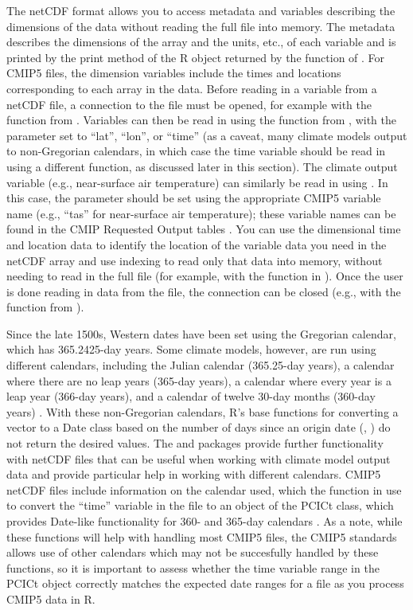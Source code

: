 The netCDF format allows you to access metadata and variables describing
the dimensions of the data without reading the full file into memory.
The metadata describes the dimensions of the array and the units, etc.,
of each variable and is printed by the print method of the R object
returned by the  function of . For CMIP5
files, the dimension variables include the times and locations
corresponding to each array in the data. Before reading in a variable
from a netCDF file, a connection to the file must be opened, for example
with the  function from . Variables can then
be read in using the  function from , with
the  parameter set to ``lat'', ``lon'', or ``time'' (as a
caveat, many climate models output to non-Gregorian calendars, in which
case the time variable should be read in using a different function, as
discussed later in this section). The climate output variable (e.g.,
near-surface air temperature) can similarly be read in using
. In this case, the  parameter should be
set using the appropriate CMIP5 variable name (e.g., ``tas'' for
near-surface air temperature); these variable names can be found in the
CMIP Requested Output tables \citep{taylor2010cmip5}. You can use the
dimensional time and location data to identify the location of the
variable data you need in the netCDF array and use indexing to read only
that data into memory, without needing to read in the full file (for
example, with the  function in
). Once the user is done reading in data from the
file, the connection can be closed (e.g., with the 
function from ).

Since the late 1500s, Western dates have been set using the Gregorian
calendar, which has 365.2425-day years. Some climate models, however,
are run using different calendars, including the Julian calendar
(365.25-day years), a calendar where there are no leap years (365-day
years), a calendar where every year is a leap year (366-day years), and
a calendar of twelve 30-day months (360-day years)
\citep{cfconventions}. With these non-Gregorian calendars, R's base
functions for converting a vector to a Date class based on the number of
days since an origin date (, ) do not
return the desired values. The  \citep{PCICt} and
 \citep{ncdf4.helpers} packages provide further
functionality with netCDF files that can be useful when working with
climate model output data and provide particular help in working with
different calendars. CMIP5 netCDF files include information on the
calendar used, which the  function in
 use to convert the ``time'' variable in the file to
an object of the PCICt class, which provides Date-like functionality for
360- and 365-day calendars \citep{PCICt}. As a note, while these
functions will help with handling most CMIP5 files, the CMIP5 standards
allows use of other calendars which may not be succesfully handled by
these functions, so it is important to assess whether the time variable
range in the PCICt object correctly matches the expected date ranges for
a file as you process CMIP5 data in R.

